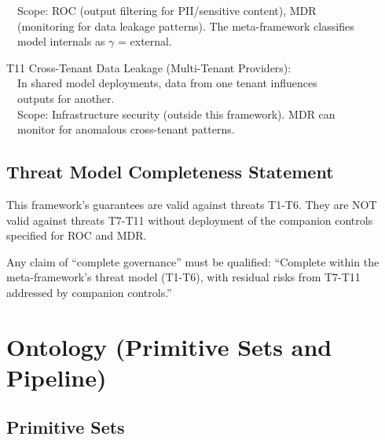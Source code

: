 \begin{claddisp}
~~Scope: ROC (output filtering for PII/sensitive content), MDR\\
~~(monitoring for data leakage patterns). The meta-framework classifies\\
~~model internals as $\gamma$ = external.
\par\smallskip
T11 \textemdash{} Cross-Tenant Data Leakage (Multi-Tenant Providers):\\
~~In shared model deployments, data from one tenant influences\\
~~outputs for another.\\
~~Scope: Infrastructure security (outside this framework). MDR can\\
~~monitor for anomalous cross-tenant patterns.
\end{claddisp}


\subsection{Threat Model Completeness Statement}


\begin{cdef}
This framework's guarantees are valid against threats T1-T6.
They are NOT valid against threats T7-T11 without deployment of the companion controls specified for ROC and MDR.

Any claim of ``complete governance'' must be qualified: ``Complete within the meta-framework's threat model (T1-T6), with residual risks from T7-T11 addressed by companion controls.''

\end{cdef}




\section{Ontology (Primitive Sets and Pipeline)}
\label{sec:framework-3}


\subsection{Primitive Sets}


